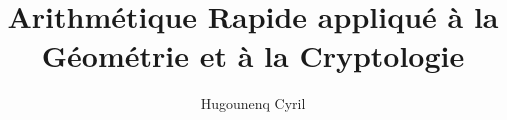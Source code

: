\documentclass[10pt,a4paper]{book}
\author{Hugounenq Cyril}
\title{Arithmétique Rapide appliqué à la Géométrie et à la Cryptologie}
\theoremstyle{plain}
\theoremstyle{definition}
\theoremstyle{definition}
\theoremstyle{definition}
\theoremstyle{definition}
\theoremstyle{remark}
\theoremstyle{remark}
\theoremstyle{definition}
\begin{document}
\fancyhf{}%
\fancyhead[L]{\nouppercase\leftmark}%
\fancyhead[R]{}
\fancyfoot[C]{\thepage}%
\fancyfoot[L]{}



\renewcommand{\headrulewidth}{1pt}%
\renewcommand{\headrule}{\hbox to\headwidth{%
  \color{orange}\leaders\hrule height \headrulewidth\hfill}}
  
\renewcommand{\footrulewidth}{1pt}%
\newcommand{\footrulecolor}{blue}


\setlength{\parskip}{-1pt plus 1pt}

\newcommand{\abstracttextfont}{\normalfont}


%
\def\algorithmicrequire{\textbf{Entrée:}}
\def\algorithmicensure{\textbf{Sortie:}}

\renewcommand{\algorithmicend}{\textbf{fin}}
\renewcommand{\algorithmicif}{\textbf{si}}
\renewcommand{\algorithmicthen}{\textbf{alors}}
\renewcommand{\algorithmicelse}{\textbf{sinon}}
\renewcommand{\algorithmicelsif}{\algorithmicelse\ \algorithmicif}
\renewcommand{\algorithmicendif}{\algorithmicend\ \algorithmicif}
\renewcommand{\algorithmicfor}{\textbf{pour}}
\renewcommand{\algorithmicforall}{\textbf{pour tout}}
\renewcommand{\algorithmicdo}{\textbf{faire}}
\renewcommand{\algorithmicendfor}{\algorithmicend\ \algorithmicfor}
\renewcommand{\algorithmicwhile}{\textbf{tant que}}
\renewcommand{\algorithmicendwhile}{\algorithmicend\ \algorithmicwhile}
\renewcommand{\algorithmicloop}{\textbf{boucle}}
\renewcommand{\algorithmicendloop}{\algorithmicend\ \algorithmicloop}
\renewcommand{\algorithmicrepeat}{\textbf{repéter}}
\renewcommand{\algorithmicuntil}{\textbf{jusqu'à}}
\renewcommand{\algorithmicprint}{\textbf{imprimer}}
\renewcommand{\algorithmicreturn}{\textbf{retourner}}
\renewcommand{\algorithmictrue}{\textbf{Vrai}}
\renewcommand{\algorithmicfalse}{\textbf{Faux}}
\renewcommand{\listalgorithmname}{Liste des algorithmes}
\end{document}
